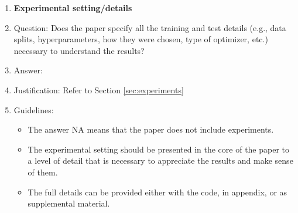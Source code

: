 \documentclass{article}
\begin{document}
\begin{enumerate}
\item {\bf Experimental setting/details}
    \item[] Question: Does the paper specify all the training and test details (e.g., data splits, hyperparameters, how they were chosen, type of optimizer, etc.) necessary to understand the results?
    \item[] Answer: \answerYes{} %
    \item[] Justification: Refer to Section \ref{sec:experiments}
    \item[] Guidelines:
    \begin{itemize}
        \item The answer NA means that the paper does not include experiments.
        \item The experimental setting should be presented in the core of the paper to a level of detail that is necessary to appreciate the results and make sense of them.
        \item The full details can be provided either with the code, in appendix, or as supplemental material.
    \end{itemize}


\end{enumerate}
\end{document}
